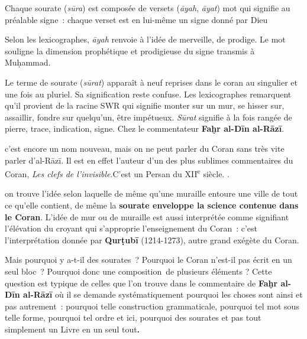 \begin{Def}[āyat]
Chaque sourate (\emph{sūra}) est composée de versets (\emph{āyah},
\emph{āyat}) mot qui signifie au préalable signe~: chaque verset est en
lui-même un signe donné par Dieu
\end{Def}



 Selon les lexicographes, \emph{āyah} renvoie à l'idée de merveille, de
prodige. Le mot souligne la dimension prophétique et prodigieuse du
signe transmis à Muḥammad.

Le terme de sourate (\emph{sūrat}) apparaît à neuf reprises dans le
coran au singulier et une fois au pluriel. Sa signification reste
confuse. Les lexicographes remarquent qu'il provient de la racine SWR
qui signifie monter sur un mur, se hisser sur, assaillir, fondre sur
quelqu'un, être impétueux. \emph{Sūrat}
signifie à la fois rangée de pierre, trace, indication, signe. Chez le
commentateur \textbf{Faḫr al-Dīn al-Rāzī}.


{c'est encore un nom nouveau, mais on ne peut parler du
Coran sans très vite parler d'al-Rāzī. Il est en effet l'auteur d'un des
plus sublimes commentaires du Coran, \emph{Les clefs de l'invisible}.C'est un Persan du XII\textsuperscript{e} siècle.}
. 

on trouve l'idée selon laquelle de même qu'une muraille entoure une
ville de tout ce qu'elle contient, de même la \textbf{sourate enveloppe
la science contenue dans le Coran}. L'idée de mur ou de muraille est
aussi interprétée comme signifiant l'élévation du croyant qui
s'approprie l'enseignement du Coran~: c'est l'interprétation donnée par
\textbf{Qurṭubī} (1214-1273), autre grand exégète du Coran.

Mais pourquoi y a-t-il des sourates~? Pourquoi le Coran n'est-il pas
écrit en un seul bloc~? Pourquoi donc une composition~de plusieurs
éléments ? Cette question est typique de celles que l'on trouve dans le
commentaire de \textbf{Faḫr al-Dīn al-Rāzī} où il se demande
systématiquement pourquoi les choses sont ainsi et pas autrement~:
pourquoi telle construction grammaticale, pourquoi tel mot sous telle
forme, pourquoi tel ordre et ici, pourquoi des sourates et pas tout
simplement un Livre en un seul tout\textbf{.} 

